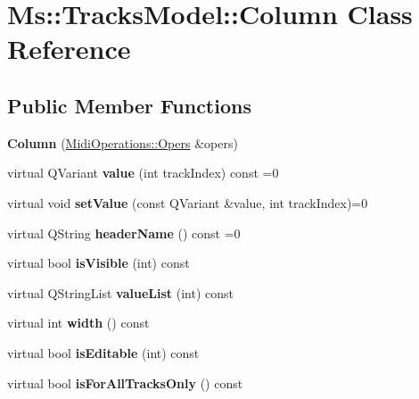 \hypertarget{class_ms_1_1_tracks_model_1_1_column}{}\section{Ms\+:\+:Tracks\+Model\+:\+:Column Class Reference}
\label{class_ms_1_1_tracks_model_1_1_column}
\subsection*{Public Member Functions}
\begin{DoxyCompactItemize}
\item 
\mbox{\label{class_ms_1_1_tracks_model_1_1_column_ab5afa2290b9f8f4ea45a4a9f6b88fa96}} 
{\bfseries Column} (\hyperlink{struct_ms_1_1_midi_operations_1_1_opers}{Midi\+Operations\+::\+Opers} \&opers)
\item 
\mbox{\label{class_ms_1_1_tracks_model_1_1_column_a829fae22d91ca2466be0e0f1d4a05e49}} 
virtual Q\+Variant {\bfseries value} (int track\+Index) const =0
\item 
\mbox{\label{class_ms_1_1_tracks_model_1_1_column_a2026ce6269e3cd752dcbadc1f797d9dc}} 
virtual void {\bfseries set\+Value} (const Q\+Variant \&value, int track\+Index)=0
\item 
\mbox{\label{class_ms_1_1_tracks_model_1_1_column_a5a08ec76dc94b5676733845c370be020}} 
virtual Q\+String {\bfseries header\+Name} () const =0
\item 
\mbox{\label{class_ms_1_1_tracks_model_1_1_column_ad78df91d9b543c93320aa7590f3c1ce9}} 
virtual bool {\bfseries is\+Visible} (int) const
\item 
\mbox{\label{class_ms_1_1_tracks_model_1_1_column_a1316b0fd5e9fffda3ffd88cce57d01b7}} 
virtual Q\+String\+List {\bfseries value\+List} (int) const
\item 
\mbox{\label{class_ms_1_1_tracks_model_1_1_column_a5d2ed884c8468abebe9cec5f8989ddac}} 
virtual int {\bfseries width} () const
\item 
\mbox{\label{class_ms_1_1_tracks_model_1_1_column_a76afae68df17492b8e7a172004cdd8c6}} 
virtual bool {\bfseries is\+Editable} (int) const
\item 
\mbox{\label{class_ms_1_1_tracks_model_1_1_column_a22612da857960cb31cd0bb7af55089e8}} 
virtual bool {\bfseries is\+For\+All\+Tracks\+Only} () const
\end{DoxyCompactItemize}
